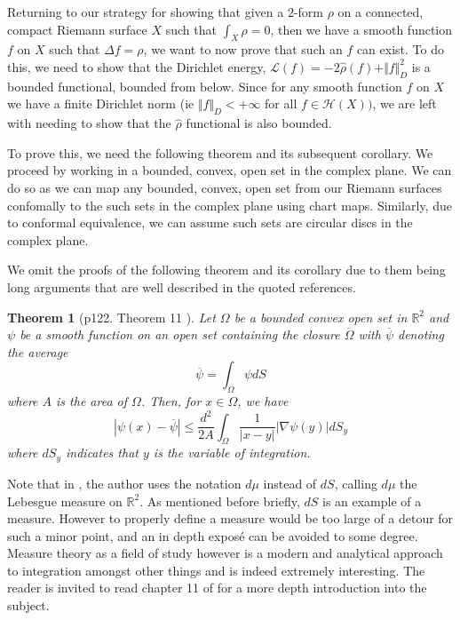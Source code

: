\documentclass[11pt]{report}
\newtheorem{thm}{Theorem}[section]
\theoremstyle{definition}
\begin{document}
Returning to our strategy for showing that given a $2$-form $\rho$ on a connected, compact Riemann surface $X$ such that $\int_X \rho = 0$, then we have a smooth function $f$ on $X$ such that $\Delta f = \rho$, we want to now prove that such an $f$ can exist. To do this, we need to show that the Dirichlet energy, $\mathcal{L}(f) = -2\hat{\rho}(f) + \Vert f \Vert^2_D$ is a bounded functional, bounded from below. Since for any smooth function $f$ on $X$ we have a finite Dirichlet norm (ie $\Vert f \Vert_D < +\infty $ for all $f \in \mathcal{H}(X))$, %
we are left with needing to show that the $\hat{\rho}$ functional is also bounded.

To prove this, we need the following theorem and its subsequent corollary. We proceed by working in a bounded, convex, open set in the complex plane. We can do so as we can map any bounded, convex, open set from our Riemann surfaces confomally to the such sets in the complex plane using chart maps. Similarly, due to conformal equivalence, we can assume such sets are circular discs in the complex plane.

We omit the proofs of the following theorem and its corollary due to them being long arguments that are well described in the quoted references.
\begin{thm}[p122. Theorem 11 \cite{donaldson}]\label{quotedTheorem11}
  Let $\Omega$ be a bounded convex open set in $\mathbb{R}^2$ and $\psi$ be a smooth function on an open set containing the closure $\overline{\Omega}$ with $\overline{\psi}$ denoting the average 
  \[\overline{\psi} = \int_{\Omega}\psi dS\] 
  where $A$ is the area of $\Omega$. Then, for $x \in \Omega$, we have 
  \[|\psi(x) - \overline{\psi}| \leq \frac{d^2}{2A}\int_\Omega \frac{1}{|x - y|}|\nabla\psi(y)|dS_y\] where $dS_y$ indicates that $y$ is the variable of integration.
\end{thm}
Note that in \cite{donaldson}, the author uses the notation $d\mu$ instead of $dS$, calling $d\mu$ the Lebesgue measure on $\mathbb{R}^2$. As mentioned before briefly, $dS$ is an example of a measure. However to properly define a measure would be too large of a detour for such a minor point, and an in depth expos\'{e} can be avoided to some degree. Measure theory as a field of study however is a modern and analytical approach to integration amongst other things and is indeed extremely interesting. The reader is invited to read chapter 11 of \cite{babyRudin} for a more depth introduction into the subject.
\end{document}
